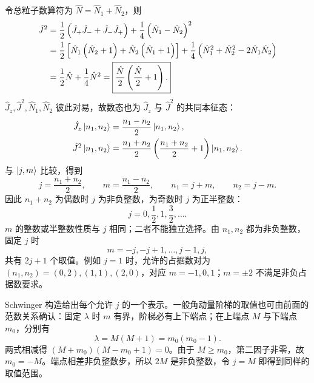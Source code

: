 令总粒子数算符为 $\hat N=\hat N_1+\hat N_2$，则
\begin{align}
\hat J^2
&=\frac12\left(\hat J_+\hat J_-+\hat J_-\hat J_+\right)
+\frac14\left(\hat N_1-\hat N_2\right)^2\notag\\
&=\frac12\left[\hat N_1\left(\hat N_2+1\right)+\hat N_2\left(\hat N_1+1\right)\right]
+\frac14\left(\hat N_1^2+\hat N_2^2-2\hat N_1\hat N_2\right)\notag\\
&=\frac12\hat N+\frac14\hat N^2
=\boxed{\frac{\hat N}{2}\left(\frac{\hat N}{2}+1\right).}
\label{eq:schwinger-casimir}
\end{align}
$\hat J_z,\hat J^2,\hat N_1,\hat N_2$ 彼此对易，故数态也为 $\hat J_z$ 与 $\hat J^2$ 的共同本征态：
\begin{align}
\hat J_z\Ket{n_1,n_2}&=\frac{n_1-n_2}{2}\Ket{n_1,n_2},\\
\hat J^2\Ket{n_1,n_2}&=\frac{n_1+n_2}{2}\left(\frac{n_1+n_2}{2}+1\right)\Ket{n_1,n_2}.
\end{align}
与 $\Ket{j,m}$ 比较，得到
\begin{equation}
\boxed{j=\frac{n_1+n_2}{2},\qquad m=\frac{n_1-n_2}{2},\qquad
n_1=j+m,\qquad n_2=j-m.}
\end{equation}
因此 $n_1+n_2$ 为偶数时 $j$ 为非负整数，为奇数时 $j$ 为正半整数：
\begin{equation}
j=0,\frac12,1,\frac32,\ldots.
\end{equation}
$m$ 的整数或半整数性质与 $j$ 相同；二者不能独立选择。由 $n_1,n_2$ 都为非负整数，固定 $j$ 时
\begin{equation}
\boxed{m=-j,-j+1,\ldots,j-1,j,}
\end{equation}
共有 $2j+1$ 个取值。例如 $j=1$ 时，允许的占据数对为
$\left(n_1,n_2\right)=\left(0,2\right),\left(1,1\right),\left(2,0\right)$，对应 $m=-1,0,1$；$m=\pm2$ 不满足非负占据数要求。

Schwinger 构造给出每个允许 $j$ 的一个表示。一般角动量阶梯的取值也可由前面的范数关系确认：固定 $\lambda$ 时 $m$ 有界，阶梯必有上下端点；在上端点 $M$ 与下端点 $m_0$，分别有
\begin{equation}
\lambda=M\left(M+1\right)=m_0\left(m_0-1\right).
\end{equation}
两式相减得 $\left(M+m_0\right)\left(M-m_0+1\right)=0$。由于 $M\geq m_0$，第二因子非零，故 $m_0=-M$。端点相差非负整数步，所以 $2M$ 是非负整数，令 $j=M$ 即得到同样的取值范围。

